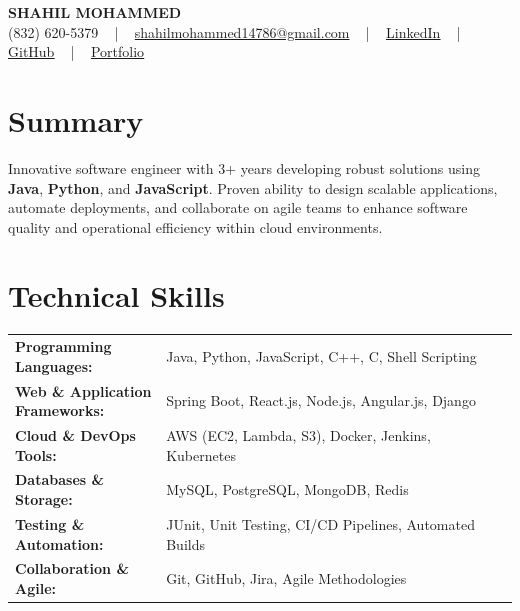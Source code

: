 \documentclass[letterpaper,11pt]{article}
\begin{document}
\begin{center}
    {\fontsize{14pt}{12pt}\selectfont \textbf{\MakeUppercase{Shahil Mohammed}}}\\ \vspace{2pt}
    \fontsize{10pt}{12pt}\selectfont (832) 620-5379 ~ | ~ \href{mailto:shahilmohammed14786@gmail.com}{shahilmohammed14786@gmail.com} ~ | ~  
    \href{https://www.linkedin.com/in/shahil-mohammed-9652931a1/}{\color{blue}\underline{LinkedIn}}  ~ | ~ 
    \href{https://github.com/freakbeast14}{\color{blue}\underline{GitHub}} ~ | ~ 
    \href{https://shahil-mohammed.netlify.app/}{\color{blue}\underline{Portfolio}}
    \vspace{-8pt}
\end{center}

\section{Summary}
\fontsize{9pt}{10pt}\selectfont
Innovative software engineer with 3+ years developing robust solutions using \textbf{Java}, \textbf{Python}, and \textbf{JavaScript}. Proven ability to design scalable applications, automate deployments, and collaborate on agile teams to enhance software quality and operational efficiency within cloud environments.

 \vspace{-5pt}
 
\section{Technical Skills}
        \vspace{-14pt}
        \begin{table}[h]
            \fontsize{9pt}{10pt}\selectfont
            \begin{tabular}{p{0.3\linewidth} p{0.7\linewidth}}
                \textbf{Programming Languages:} & Java, Python, JavaScript, C++, C, Shell Scripting \\
                \textbf{Web \& Application Frameworks:} & Spring Boot, React.js, Node.js, Angular.js, Django \\
                \textbf{Cloud \& DevOps Tools:} & AWS (EC2, Lambda, S3), Docker, Jenkins, Kubernetes \\
                \textbf{Databases \& Storage:} & MySQL, PostgreSQL, MongoDB, Redis \\
                \textbf{Testing \& Automation:} & JUnit, Unit Testing, CI/CD Pipelines, Automated Builds \\
                \textbf{Collaboration \& Agile:} & Git, GitHub, Jira, Agile Methodologies \\
            \end{tabular}
        \end{table}
 \vspace{-15pt}
 
\end{document}
